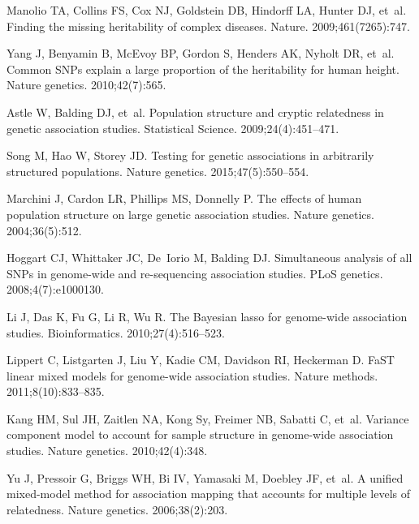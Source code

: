 \documentclass[10pt,letterpaper]{article}
\begin{document}
%

\begin{thebibliography}{10}
	
	Manolio TA, Collins FS, Cox NJ, Goldstein DB, Hindorff LA, Hunter DJ, et~al.
	\newblock Finding the missing heritability of complex diseases.
	\newblock Nature. 2009;461(7265):747.
	
	Yang J, Benyamin B, McEvoy BP, Gordon S, Henders AK, Nyholt DR, et~al.
	\newblock Common SNPs explain a large proportion of the heritability for human
	height.
	\newblock Nature genetics. 2010;42(7):565.
	
	Astle W, Balding DJ, et~al.
	\newblock Population structure and cryptic relatedness in genetic association
	studies.
	\newblock Statistical Science. 2009;24(4):451--471.
	
	Song M, Hao W, Storey JD.
	\newblock Testing for genetic associations in arbitrarily structured
	populations.
	\newblock Nature genetics. 2015;47(5):550--554.
	
	Marchini J, Cardon LR, Phillips MS, Donnelly P.
	\newblock The effects of human population structure on large genetic
	association studies.
	\newblock Nature genetics. 2004;36(5):512.
	
	Hoggart CJ, Whittaker JC, De~Iorio M, Balding DJ.
	\newblock Simultaneous analysis of all SNPs in genome-wide and re-sequencing
	association studies.
	\newblock PLoS genetics. 2008;4(7):e1000130.
	
	Li J, Das K, Fu G, Li R, Wu R.
	\newblock The Bayesian lasso for genome-wide association studies.
	\newblock Bioinformatics. 2010;27(4):516--523.
	
	Lippert C, Listgarten J, Liu Y, Kadie CM, Davidson RI, Heckerman D.
	\newblock FaST linear mixed models for genome-wide association studies.
	\newblock Nature methods. 2011;8(10):833--835.
	
	Kang HM, Sul JH, Zaitlen NA, Kong Sy, Freimer NB, Sabatti C, et~al.
	\newblock Variance component model to account for sample structure in
	genome-wide association studies.
	\newblock Nature genetics. 2010;42(4):348.
	
	Yu J, Pressoir G, Briggs WH, Bi IV, Yamasaki M, Doebley JF, et~al.
	\newblock A unified mixed-model method for association mapping that accounts
	for multiple levels of relatedness.
	\newblock Nature genetics. 2006;38(2):203.
	

\end{thebibliography}
\end{document}
